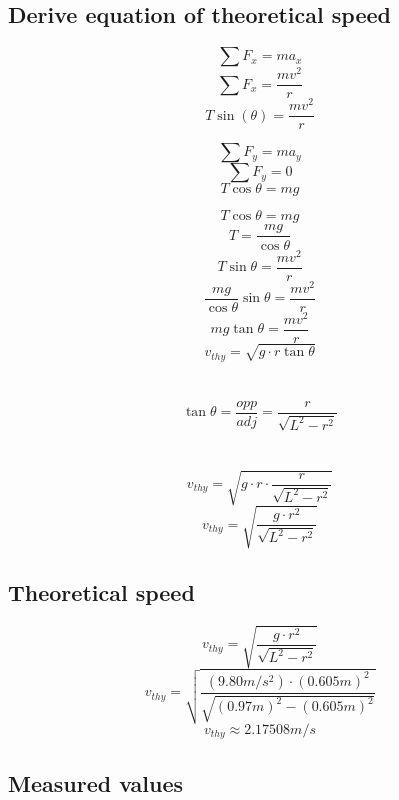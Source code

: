\documentclass[11pt, letterpaper, includehead]{article}
\begin{document}
\subsection{Derive equation of theoretical speed}
\begin{multicols}{2}
  $$\sum F_x = ma_x$$
  $$\sum F_x = \frac{mv^2}{r}$$
  $$T\sin(\theta) = \frac{mv^2}{r}$$

  \columnbreak
  $$\sum F_y = ma_y$$
  $$\sum F_y = 0$$
  $$T\cos\theta = mg$$
\end{multicols}

$$T\cos\theta = mg$$
$$T = \frac{mg}{\cos\theta}$$
$$T\sin\theta = \frac{mv^2}{r}$$
$$\frac{mg}{\cos\theta}\sin\theta = \frac{mv^2}{r}$$
$$mg\tan\theta = \frac{mv^2}{r}$$
$$v_{thy} = \sqrt{g \cdot r\tan\theta}$$\\\\
$$\tan\theta = \frac{opp}{adj} = \frac{r}{\sqrt{L^2-r^2}}$$\\\\
$$v_{thy} = \sqrt{g\cdot r\cdot\frac{r}{\sqrt{L^2-r^2}}}$$
$$\boxed{v_{thy} = \sqrt{\frac{g\cdot r^2}{\sqrt{L^2-r^2}}}}$$

\subsection{Theoretical speed}

$$v_{thy} = \sqrt{\frac{g\cdot r^2}{\sqrt{L^2-r^2}}}$$
$$v_{thy} = \sqrt{\frac{(9.80m/s^2)\cdot (0.605m)^2}{\sqrt{(0.97m)^2-(0.605m)^2}}}$$
$$\boxed{v_{thy} \approx 2.17508m/s}$$

\subsection{Measured values}
\end{document}
